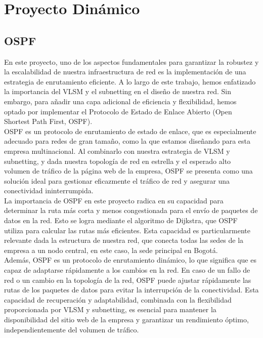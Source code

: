 \section{Proyecto Dinámico}

\subsection{OSPF}

En este proyecto, uno de los aspectos fundamentales para garantizar la robustez
y la escalabilidad de nuestra infraestructura de red es la implementación de
una estrategia de enrutamiento eficiente. A lo largo de este trabajo, hemos
enfatizado la importancia del VLSM y el subnetting en el diseño de nuestra red.
Sin embargo, para añadir una capa adicional de eficiencia y flexibilidad, hemos
optado por implementar el Protocolo de Estado de Enlace Abierto
(Open Shortest Path First, OSPF).
\\

OSPF es un protocolo de enrutamiento de estado de enlace, que es especialmente
adecuado para redes de gran tamaño, como la que estamos diseñando para esta
empresa multinacional. Al combinarlo con nuestra estrategia de VLSM y
subnetting, y dada nuestra topología de red en estrella y el esperado alto
volumen de tráfico de la página web de la empresa, OSPF se presenta como una
solución ideal para gestionar eficazmente el tráfico de red y asegurar una
conectividad ininterrumpida.
\\

La importancia de OSPF en este proyecto radica en su capacidad para determinar
la ruta más corta y menos congestionada para el envío de paquetes de datos en
la red. Esto se logra mediante el algoritmo de Dijkstra, que OSPF utiliza para
calcular las rutas más eficientes. Esta capacidad es particularmente relevante
dada la estructura de nuestra red, que conecta todas las sedes de la empresa a
un nodo central, en este caso, la sede principal en Bogotá.
\\

Además, OSPF es un protocolo de enrutamiento dinámico, lo que significa que es
capaz de adaptarse rápidamente a los cambios en la red. En caso de un fallo de
red o un cambio en la topología de la red, OSPF puede ajustar rápidamente las
rutas de los paquetes de datos para evitar la interrupción de la conectividad.
Esta capacidad de recuperación y adaptabilidad, combinada con la flexibilidad
proporcionada por VLSM y subnetting, es esencial para mantener la disponibilidad
del sitio web de la empresa y garantizar un rendimiento óptimo,
independientemente del volumen de tráfico.
\\

